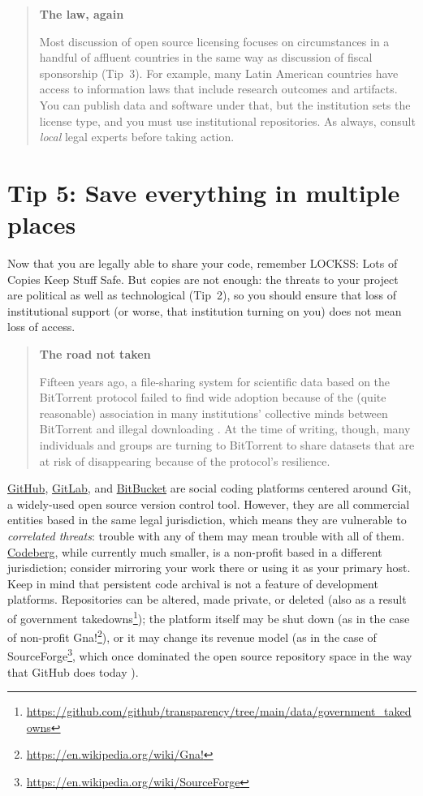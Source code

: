 \documentclass[10pt,letterpaper]{article}
\begin{document}
\begin{quote}
  \noindent
  \textbf{The law, again}

  Most discussion of open source licensing focuses on circumstances in a handful of affluent countries
  in the same way as discussion of fiscal sponsorship (Tip~3).
  For example,
  many Latin American countries have access to information laws that include research outcomes and artifacts.
  You can publish data and software under that,
  but the institution sets the license type,
  and you must use institutional repositories.
  As always,
  consult \emph{local} legal experts before taking action.
\end{quote}

\section*{Tip 5: Save everything in multiple places}

Now that you are legally able to share your code, remember LOCKSS: Lots of Copies Keep Stuff Safe.
But copies are not enough:
the threats to your project are political as well as technological (Tip~2),
so you should ensure that loss of institutional support
(or worse, that institution turning on you)
does not mean loss of access.

\begin{quote}
  \noindent
  \textbf{The road not taken}

  Fifteen years ago,
  a file-sharing system for scientific data based on the BitTorrent protocol
  failed to find wide adoption because of the (quite reasonable) association in many institutions' collective minds
  between BitTorrent and illegal downloading \cite{Langille2010}.
  At the time of writing,
  though,
  many individuals and groups are turning to BitTorrent to share datasets that are at risk of disappearing
  because of the protocol's resilience.
\end{quote}

\href{https://github.com/}{GitHub},
\href{https://gitlab.com/}{GitLab},
and \href{https://bitbucket.org/}{BitBucket}
are social coding platforms centered around Git,
a widely-used open source version control tool.
However,
they are all commercial entities based in the same legal jurisdiction,
which means they are vulnerable to \emph{correlated threats}:
trouble with any of them may mean trouble with all of them.
\href{https://codeberg.org/}{Codeberg},
while currently much smaller,
is a non-profit based in a different jurisdiction;
consider mirroring your work there or using it as your primary host.
Keep in mind that persistent code archival is not a feature of development platforms.
Repositories can be altered,
made private,
or deleted
(also as a result of government takedowns\footnote{\url{https://github.com/github/transparency/tree/main/data/government_takedowns}});
the platform itself may be shut down
(as in the case of non-profit Gna!\footnote{\url{https://en.wikipedia.org/wiki/Gna!}}),
or it may change its revenue model
(as in the case of SourceForge\footnote{\url{https://en.wikipedia.org/wiki/SourceForge}},
which once dominated the open source repository space in the way that GitHub does today \cite{Tamburri2020}).
\end{document}
